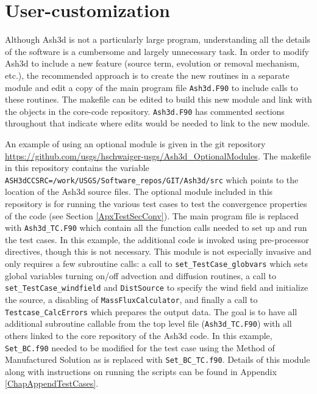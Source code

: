 \section{User-customization}\label{ChapSoftwareStructureUserCust}
Although Ash3d is not a particularly large program, understanding all the
details of the software is a cumbersome and largely unnecessary task.  In
order to modify Ash3d to include a new feature (source term,
evolution or removal mechanism, etc.), the recommended approach is to
create the new routines in a separate module and edit a copy of the main
program file \texttt{Ash3d.F90} to include calls to these routines.  The makefile
can be edited to build this new module and link with the objects in the
core-code repository.  \texttt{Ash3d.F90} has commented sections throughout
that indicate where edits would be needed to link to the new module.

An example
of using an optional module is given in the git repository
\url{https://github.com/usgs/hschwaiger-usgs/Ash3d\_OptionalModules}.
The makefile in this repository contains the variable
\texttt{ASH3dCCSRC=/work/USGS/Software\_repos/GIT/Ash3d/src} which points to the
location of the Ash3d source files.  The optional module included in this repository
is for running the various test cases to test the convergence properties
of the code (see Section \ref{ApxTestSecConv}).  The main program file is replaced with
\texttt{Ash3d\_TC.F90} which contain all the function calls needed to set up and
run the test cases.  In this example, the additional code is invoked using
pre-processor directives, though this is not necessary.
This module is not especially invasive and only requires a few subroutine calls:
a call to \texttt{set\_TestCase\_globvars} which sets global variables turning on/off
advection and diffusion routines, a call to \texttt{set\_TestCase\_windfield} and
\texttt{DistSource} to specify the wind field and initialize the source, a disabling
of \texttt{MassFluxCalculator}, and finally a call to \texttt{Testcase\_CalcErrors}
which prepares the output data. The goal is to have all additional subroutine callable
from the top level file (\texttt{Ash3d\_TC.F90}) with all others linked to
the core repository of the Ash3d
code. In this example, \texttt{Set\_BC.f90} needed to be modified for the
test case using the Method of Manufactured Solution as is replaced with
\texttt{Set\_BC\_TC.f90}.
Details of this module along with instructions on running the scripts can be found
in Appendix \ref{ChapAppendTestCases}.

